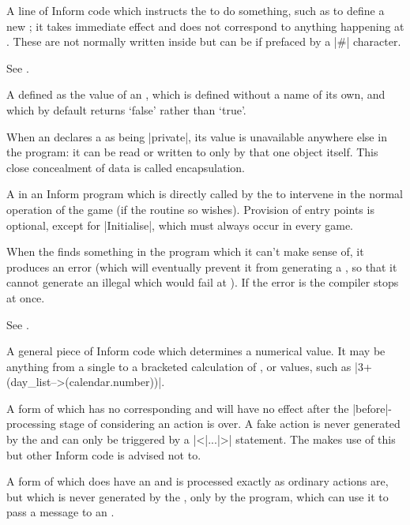 %
A line of Inform code which instructs the  to do something, such as
to define a new ; it takes immediate effect and does not correspond
to anything happening at .  These are not normally written inside
 but can be if prefaced by a |#| character.

%
See .

%
A  defined as the  value of an , which
is defined without a name of its own, and which by default returns `false'
rather than `true'.

%
When an  declares a  as being |private|, its value
is unavailable anywhere else in the program: it can be read or written to
only by that one object itself.  This close concealment of data is called
encapsulation.

%
A  in an Inform program which is directly called by the 
to intervene in the normal operation of the game (if the routine so wishes).  
Provision of entry points is optional, except for |Initialise|, which must
always occur in every game.

%
When the  finds something in the program which it can't make sense
of, it produces an error (which will eventually prevent it from generating a
, so that it cannot generate an illegal  which
would fail at ).  If the error is  the compiler stops
at once.

%
See .

%
A general piece of Inform code which determines a numerical value.  It may
be anything from a single  to a bracketed calculation of
,  or  values, such as
|3+(day_list-->(calendar.number))|.

%
A form of  which has no corresponding  and will
have no effect after the |before|-processing stage of considering an action
is over.  A fake action is never generated by the  and can only be
triggered by a |<|...|>| statement.  The  makes use of this but
other Inform code is advised not to.

%
A form of  which does have an  and is processed
exactly as ordinary actions are, but which is never generated by the
, only by the program, which can use it to pass a message to an
.

